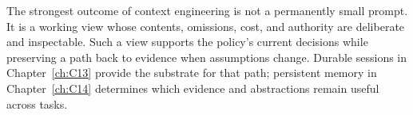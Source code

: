 The strongest outcome of context engineering is not a permanently small prompt. It is a working view whose contents, omissions, cost, and authority are deliberate and inspectable. Such a view supports the policy's current decisions while preserving a path back to evidence when assumptions change. Durable sessions in Chapter~\ref{ch:C13} provide the substrate for that path; persistent memory in Chapter~\ref{ch:C14} determines which evidence and abstractions remain useful across tasks.
